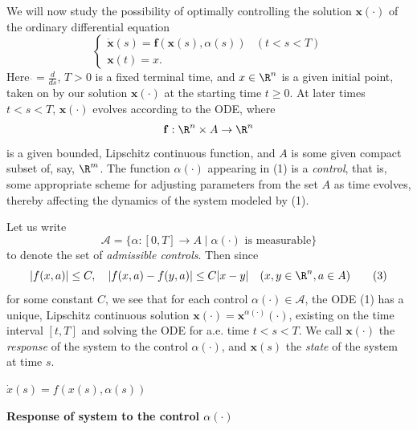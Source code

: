 \begin{definition}
\label{def:controlled-ode-admissible-controls}
We will now study the possibility of optimally controlling the solution $\mathbf{x}(\cdot)$ of the ordinary differential equation
\[
\begin{cases} \dot{\mathbf{x}}(s) = \mathbf{f}(\mathbf{x}(s), \alpha(s)) & (t < s < T) \\ \mathbf{x}(t) = x. \end{cases}
\tag{1}
\]
Here $\dot{} = \frac{d}{ds}$, $T > 0$ is a fixed terminal time, and $x \in \R^n$ is a given initial point, taken on by our solution $\mathbf{x}(\cdot)$ at the starting time $t \geq 0$. At later times $t < s < T$, $\mathbf{x}(\cdot)$ evolves according to the ODE, where
\[
\mathbf{f} : \R^n \times A \to \R^n
\]
is a given bounded, Lipschitz continuous function, and $A$ is some given compact subset of, say, $\R^m$. The function $\alpha(\cdot)$ appearing in (1) is a \textit{control}, that is, some appropriate scheme for adjusting parameters from the set $A$ as time evolves, thereby affecting the dynamics of the system modeled by (1).

Let us write
\[
\mathcal{A} = \{\alpha : [0,T] \to A \mid \alpha(\cdot) \text{ is measurable}\}
\tag{2}
\]
to denote the set of \textit{admissible controls}. Then since
\[
|f(x,a)| \leq C, \quad |f(x,a) - f(y,a)| \leq C|x - y| \quad (x,y \in \R^n, a \in A)
\tag{3}
\]
for some constant $C$, we see that for each control $\alpha(\cdot) \in \mathcal{A}$, the ODE (1) has a unique, Lipschitz continuous solution $\mathbf{x}(\cdot) = \mathbf{x}^{\alpha(\cdot)}(\cdot)$, existing on the time interval $[t, T]$ and solving the ODE for a.e. time $t < s < T$. We call $\mathbf{x}(\cdot)$ the \textit{response} of the system to the control $\alpha(\cdot)$, and $\mathbf{x}(s)$ the \textit{state} of the system at time $s$.
\end{definition}

\begin{figure}[h]\centering
\end{figure}

$\dot{x}(s) = f(x(s), \alpha(s))$

\textbf{Response of system to the control $\alpha(\cdot)$}

